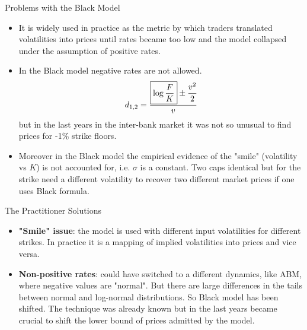 \documentclass{beamer}
\begin{document}
\begin{frame}{Problems with the Black Model}
\begin{itemize}
\item It is widely used in practice as the metric by which traders translated volatilities into prices until rates became too low and the model collapsed under the assumption of positive rates.
\item In the Black model \textcolor{maincolor}{negative rates are not allowed}.
\begin{equation*}
	d_{1,2} = \frac{\boxed{\log{\frac{F}{K}}} \pm \cfrac{v^2}{2}}{v}
\end{equation*}
but in the last years in the inter-bank market it was not so unusual to find prices for -1\% strike floors.
\item Moreover in the Black model the empirical evidence of the "smile" (volatility vs $K$) is not accounted for, i.e. $\sigma$ is a constant. Two caps identical but for the strike need a different volatility to recover two different market prices if one uses Black formula.
\end{itemize}
\end{frame}

\begin{frame}{The Practitioner Solutions}
\begin{itemize}
\item \textbf{"Smile" issue}: the model is used with \textcolor{maincolor}{different input volatilities for different strikes}. In practice it is a mapping of implied volatilities into prices and vice versa.
\item \textbf{Non-positive rates}: could have switched to a different dynamics, like ABM, where negative values are "normal". But there are large differences in the tails between normal and log-normal distributions.
So Black model has been \textcolor{maincolor}{shifted}. The technique was already known but in the last years became crucial to shift the lower bound of prices admitted by the model.
\end{itemize}
\end{frame}
\end{document}

